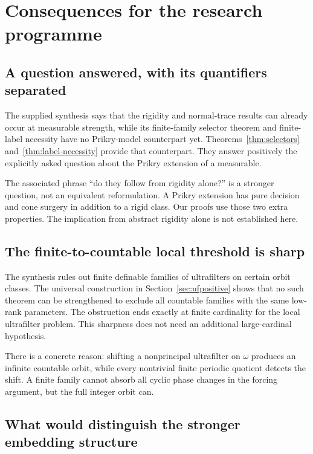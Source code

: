 \documentclass[11pt,letterpaper]{article}
\theoremstyle{definition}
\numberwithin{equation}{section}
\begin{document}
\section{Consequences for the research programme}\label{sec:consequences}

\subsection{A question answered, with its quantifiers separated}

The supplied synthesis says that the rigidity and normal-trace results can already occur at measurable strength, while its finite-family selector theorem and finite-label necessity have no Prikry-model counterpart yet. Theorems~\ref{thm:selectors} and~\ref{thm:label-necessity} provide that counterpart. They answer positively the explicitly asked question about the Prikry extension of a measurable.

The associated phrase ``do they follow from rigidity alone?'' is a stronger question, not an equivalent reformulation. A Prikry extension has pure decision and cone surgery in addition to a rigid class. Our proofs use those two extra properties. The implication from abstract rigidity alone is not established here.

\subsection{The finite-to-countable local threshold is sharp}

The synthesis rules out finite definable families of ultrafilters on certain orbit classes. The universal construction in Section~\ref{sec:ufpositive} shows that no such theorem can be strengthened to exclude all countable families with the same low-rank parameters. The obstruction ends exactly at finite cardinality for the local ultrafilter problem. This sharpness does not need an additional large-cardinal hypothesis.

There is a concrete reason: shifting a nonprincipal ultrafilter on $\omega$ produces an infinite countable orbit, while every nontrivial finite periodic quotient detects the shift. A finite family cannot absorb all cyclic phase changes in the forcing argument, but the full integer orbit can.

\subsection{What would distinguish the stronger embedding structure}
\end{document}
